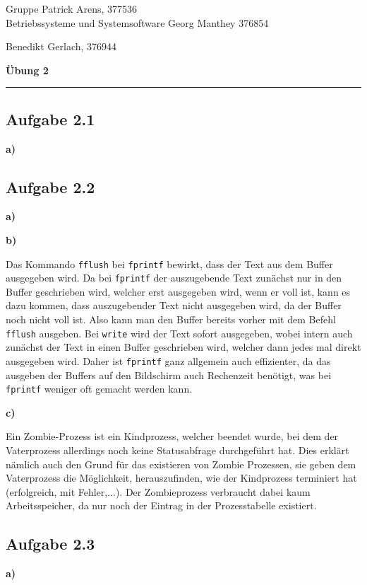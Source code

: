 \documentclass[a4paper,graphics,11pt]{article}
\newcommand{\aufgabe}[1]{\subsection*{Aufgabe #1}}
\begin{document}
    \noindent Gruppe              \hfill Patrick Arens, 377536\\
    \noindent Betriebssysteme und Systemsoftware    \hfill Georg Manthey 376854\\
    \strut\hfill Benedikt Gerlach, 376944\\
    \begin{center}
        \LARGE{\textbf{Übung 2}}
    \end{center}
    \begin{center}
    \rule[0.1ex]{\textwidth}{1pt}
    \end{center}
    
    \aufgabe{2.1}
    
    \textbf{a)}
    
    
    
    \newpage

    \aufgabe{2.2}

    \textbf{a)}

    

    \textbf{b)}

    Das Kommando \verb+fflush+ bei \verb+fprintf+ bewirkt, dass der Text aus dem Buffer ausgegeben wird. Da bei \verb+fprintf+ der auszugebende Text zunächst nur in den Buffer geschrieben wird, welcher erst ausgegeben wird, wenn er voll ist, kann es dazu kommen, dass auszugebender Text nicht ausgegeben wird, da der Buffer noch nicht voll ist. Also kann man den Buffer bereits vorher mit dem Befehl \verb+fflush+ ausgeben. Bei \verb+write+ wird der Text sofort ausgegeben, wobei intern auch zunächst der Text in einen Buffer geschrieben wird, welcher dann jedes mal direkt ausgegeben wird. Daher ist \verb+fprintf+ ganz allgemein auch effizienter, da das ausgeben der Buffers auf den Bildschirm auch Rechenzeit benötigt, was bei \verb+fprintf+ weniger oft gemacht werden kann.

    \textbf{c)}

    Ein Zombie-Prozess ist ein Kindprozess, welcher beendet wurde, bei dem der Vaterprozess allerdings noch keine Statusabfrage durchgeführt hat. Dies erklärt nämlich auch den Grund für das existieren von Zombie Prozessen, sie geben dem Vaterprozess die Möglichkeit, herauszufinden, wie der Kindprozess terminiert hat (erfolgreich, mit Fehler,...). Der Zombieprozess verbraucht dabei kaum Arbeitsspeicher, da nur noch der Eintrag in der Prozesstabelle existiert.

    \aufgabe{2.3}

    \textbf{a)}
\end{document}
